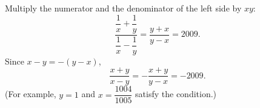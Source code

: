 Multiply the numerator and the denominator of the left side by $xy$:
\[
\dfrac{\dfrac{1}{x}+\dfrac{1}{y}}{\dfrac{1}{x}-\dfrac{1}{y}}=\dfrac{y+x}{y-x}=2009 .
\]
Since $x-y=-(y-x)$,
\[
\dfrac{x+y}{x-y}=-\dfrac{x+y}{y-x}=\boxed{-2009}.
\]
(For example, $y=1$ and $x=\dfrac{1004}{1005}$ satisfy the condition.)
